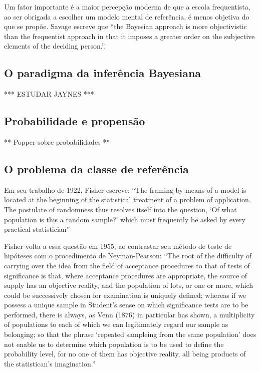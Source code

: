 \documentclass[12pt,a4paper]{article}
\begin{document}
Um fator importante é a maior percepção moderna
de que a escola frequentista, ao ser obrigada a escolher um modelo mental de referência, é menos objetiva do que se propõe.
Savage escreve que ``the Bayesian approach is more objectivistic than the frequentist approach in that it imposes a greater
order on the subjective elements of the deciding person.''\cite{Savage60}.	

\subsection{O paradigma da inferência Bayesiana}
*** ESTUDAR JAYNES ***

\subsection{Probabilidade e propensão}

	** Popper sobre probabilidades **

\subsection{O problema da classe de referência}

Em seu trabalho de 1922, Fisher escreve:
``The framing by means of a model is located at the beginning of the
statistical treatment of a problem of application. The postulate of randomness thus resolves itself into the 
question, `Of what population is this a random sample?' which must frequently be asked by every practical
statistician''\cite{Fisher1922}

Fisher volta a essa questão em 1955, ao contrastar seu método de teste de hipóteses com o procedimento de Neyman-Pearson:
``The root of the difficulty of carrying over the idea from the field of acceptance procedures to that of tests of significance
is that, where acceptance procedures are appropriate, the source of supply has an objective reality, and the population
of lots, or one or more, which could be successively chosen for examination is uniquely defined; whereas if we possess a unique
sample in Student's sense on which significance tests are to be performed, there is always, as Venn (1876) in particular has
shown, a multiplicity of populations to each of which we can legitimately regard our sample as belonging; so that the phrase
`repeated sampleing from the same population' does not enable us to determine which population is to be used to define the
probability level, for no one of them has objective reality, all being products of the statistican's imagination.''
\cite{Fisher1955}
\end{document}
